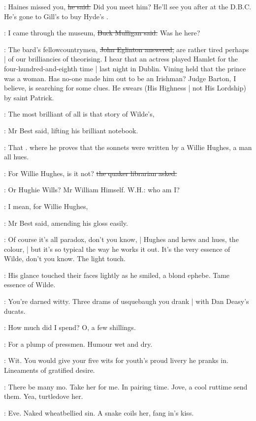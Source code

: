 \best:
Haines missed you,
\sout{he said.}
Did you meet him?
He'll see you after at the D.B.C.
He's gone to Gill's to buy Hyde's .

\mulligan:
I came through the museum,
\sout{Buck Mulligan said.}
Was he here?

\eglinton:
The bard's fellowcountrymen,
\sout{John Eglinton answered,}
are rather tired perhaps |
of our brilliancies of theorising.
I hear that an actress played Hamlet
for the four-hundred-and-eighth time |
last night in Dublin.
Vining held that the prince was a woman.
Has no-one made him out to be an Irishman?
Judge Barton,
I believe,
is searching for some clues.
He swears
(His Highness |
not His Lordship)
by saint Patrick.

\best:
The most brilliant of all is that story of Wilde's,

:
Mr Best said,
lifting his brilliant notebook.

\best:
That .
where he proves that the sonnets were written by a Willie Hughes,
a man all hues.

\librarian:
For Willie Hughes,
is it not?
\sout{the quaker librarian asked.}

\StephenInt:
Or Hughie Wills?
Mr William Himself.
W.H.:
who am I?

\best:
I mean,
for Willie Hughes,

:
Mr Best said, amending his gloss easily.

\best:
Of course it's all paradox,
don't you know, |
Hughes and hews and hues, the colour, |
but it's so typical the way he works it out.
It's the very essence of Wilde,
don't you know.
The light touch.

:
His glance touched their faces lightly as he smiled,
a blond ephebe.
Tame essence of Wilde.

\StephenInt:
You're darned witty.
Three drams of usquebaugh you drank |
with Dan Deasy's ducats.

\StephenInt:
How much did I spend?
O, a few shillings.

\StephenInt:
For a plump of pressmen.
Humour wet and dry.

\StephenInt:
Wit.
You would give your five wits for youth's proud livery he pranks in.
Lineaments of gratified desire.

\StephenInt:
There be many mo.
Take her for me.
In pairing time.
Jove, a cool ruttime send them.
Yea, turtledove her.

\StephenInt:
Eve.
Naked wheatbellied sin.
A snake coils her,
fang in's kiss.

